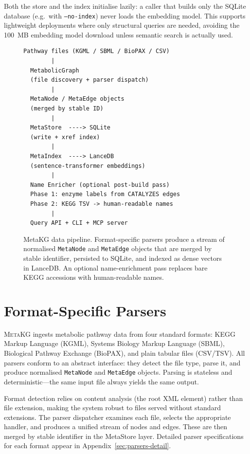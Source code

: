 \documentclass[10pt]{article}
\begin{document}
Both the store and the index initialise lazily: a caller that builds only the
SQLite database (e.g.\ with \texttt{--no-index}) never loads the embedding
model. This supports lightweight deployments where only structural queries are
needed, avoiding the 100~MB embedding model download unless semantic search is
actually used.

\begin{figure}[H]
  \centering
  \begin{lstlisting}[style=bash, frame=single, caption={High-level data flow.}]
Pathway files (KGML / SBML / BioPAX / CSV)
        |
  MetabolicGraph
  (file discovery + parser dispatch)
        |
  MetaNode / MetaEdge objects
  (merged by stable ID)
        |
  MetaStore  ----> SQLite
  (write + xref index)
        |
  MetaIndex  ----> LanceDB
  (sentence-transformer embeddings)
        |
  Name Enricher (optional post-build pass)
  Phase 1: enzyme labels from CATALYZES edges
  Phase 2: KEGG TSV -> human-readable names
        |
  Query API + CLI + MCP server
  \end{lstlisting}
  \caption{MetaKG data pipeline. Format-specific parsers produce a stream of
  normalised \texttt{MetaNode} and \texttt{MetaEdge} objects that are merged
  by stable identifier, persisted to SQLite, and indexed as dense vectors in
  LanceDB. An optional name-enrichment pass replaces bare KEGG accessions with
  human-readable names.}
  \label{fig:arch}
\end{figure}

\section{Format-Specific Parsers}
\label{sec:parsers}

\textsc{MetaKG} ingests metabolic pathway data from four standard formats:
KEGG Markup Language (KGML), Systems Biology Markup Language (SBML), Biological
Pathway Exchange (BioPAX), and plain tabular files (CSV/TSV). All parsers
conform to an abstract interface: they detect the file type, parse it, and
produce normalised \texttt{MetaNode} and \texttt{MetaEdge} objects. Parsing is
stateless and deterministic---the same input file always yields the same
output.

Format detection relies on content analysis (the root XML element) rather than
file extension, making the system robust to files served without standard
extensions. The parser dispatcher examines each file, selects the appropriate
handler, and produces a unified stream of nodes and edges. These are then
merged by stable identifier in the MetaStore layer. Detailed parser
specifications for each format appear in Appendix~\ref{sec:parsers-detail}.
\end{document}
